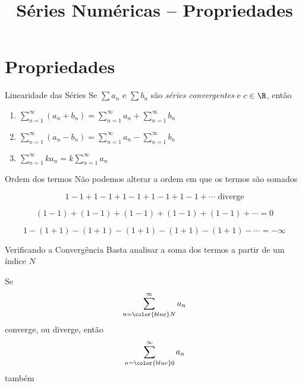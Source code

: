 
\usepackage{integracao_e_series}

\title{Séries Numéricas -- Propriedades}



\addtitle

\section{Propriedades}

\begin{frame}{Linearidade das Séries}
  Se \(\sum a_n\) e \(\sum b_n\)
  são \emph{séries convergentes} e $c\in\R$,
  \pause
  então

  \vspace{\baselineskip}
  \begin{enumerate}[<+->]
    \setlength\itemsep{1em}
    \item \( \sum_{n=1}^\infty (a_n+b_n) =  \sum_{n=1}^\infty a_n +\sum_{n=1}^\infty b_n \)
    \item \( \sum_{n=1}^\infty (a_n-b_n) =  \sum_{n=1}^\infty a_n -\sum_{n=1}^\infty b_n \)
    \item \( \sum_{n=1}^\infty ka_n      = k\sum_{n=1}^\infty a_n \)
  \end{enumerate}
\end{frame}

\begin{frame}{Ordem dos termos}
  Não podemos alterar a ordem em que os termos são somados

  \pause
  \[
    1-1+1-1+1-1+1-1+1-1+\cdots \text{ diverge}
  \]

  \pause
  \[
    (1-1)+(1-1)+(1-1)+(1-1)+(1-1)+\cdots = 0
  \]

  \pause
  \[
    1-(1+1)-(1+1)-(1+1)-(1+1)-(1+1)-\cdots = -\infty
  \]
\end{frame}

\begin{frame}{Verificando a Convergência}
  Basta analisar a soma dos termos a partir de um índice $N$

  \pause
  \vspace{0.5\baselineskip}
  Se
  \[
    \sum_{n={\color{blue}N}}^\infty a_n
  \]
  converge, ou diverge, então
  \[
    \sum_{n={\color{blue}0}}^\infty a_n
  \]
  também
\end{frame}

